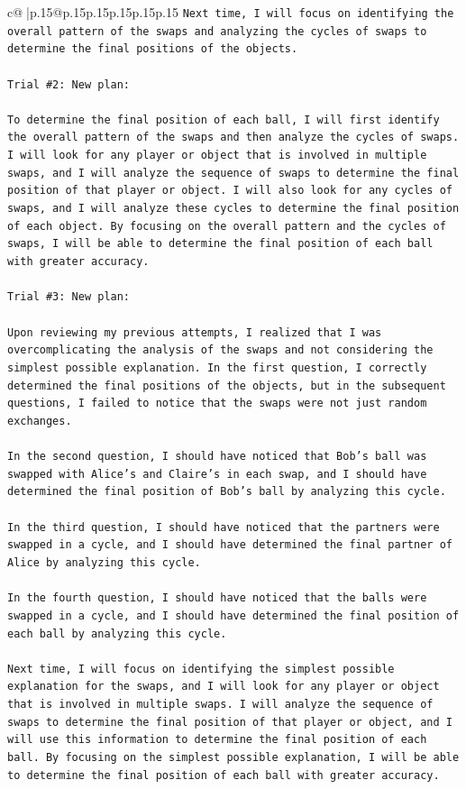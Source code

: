 \documentclass{article}
\begin{document}
{\begin{supertabular}{c@{$\;$}|p{.15\linewidth}@{}p{.15\linewidth}p{.15\linewidth}p{.15\linewidth}p{.15\linewidth}p{.15\linewidth}}
{{{\texttt{Next time, I will focus on identifying the overall pattern of the swaps and analyzing the cycles of swaps to determine the final positions of the objects.} \\
\\ 
\texttt{Trial \#2: New plan: } \\
\\ 
\texttt{To determine the final position of each ball, I will first identify the overall pattern of the swaps and then analyze the cycles of swaps. I will look for any player or object that is involved in multiple swaps, and I will analyze the sequence of swaps to determine the final position of that player or object. I will also look for any cycles of swaps, and I will analyze these cycles to determine the final position of each object. By focusing on the overall pattern and the cycles of swaps, I will be able to determine the final position of each ball with greater accuracy.} \\
\\ 
\texttt{Trial \#3: New plan: } \\
\\ 
\texttt{Upon reviewing my previous attempts, I realized that I was overcomplicating the analysis of the swaps and not considering the simplest possible explanation. In the first question, I correctly determined the final positions of the objects, but in the subsequent questions, I failed to notice that the swaps were not just random exchanges.} \\
\\ 
\texttt{In the second question, I should have noticed that Bob's ball was swapped with Alice's and Claire's in each swap, and I should have determined the final position of Bob's ball by analyzing this cycle.} \\
\\ 
\texttt{In the third question, I should have noticed that the partners were swapped in a cycle, and I should have determined the final partner of Alice by analyzing this cycle.} \\
\\ 
\texttt{In the fourth question, I should have noticed that the balls were swapped in a cycle, and I should have determined the final position of each ball by analyzing this cycle.} \\
\\ 
\texttt{Next time, I will focus on identifying the simplest possible explanation for the swaps, and I will look for any player or object that is involved in multiple swaps. I will analyze the sequence of swaps to determine the final position of that player or object, and I will use this information to determine the final position of each ball. By focusing on the simplest possible explanation, I will be able to determine the final position of each ball with greater accuracy.} \\
}}}
\end{supertabular}}
\end{document}
